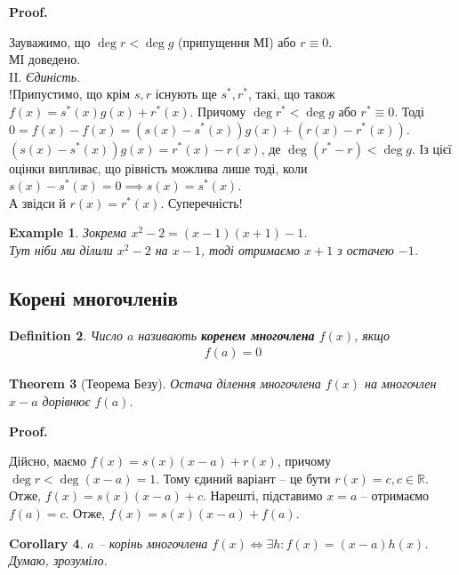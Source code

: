 \documentclass[a4paper, 10pt]{extarticle}
\makeatletter
\def\qed{$\blacksquare$}
\def\qed{$\blacksquare$}
\theoremstyle{theoremdd}
\newtheorem{theorem}{Theorem}[subsection]
\theoremstyle{theoremdd}
\newtheorem{definition}[theorem]{Definition}
\theoremstyle{theoremdd}
\theoremstyle{theoremdd}
\newtheorem{example}[theorem]{Example}
\theoremstyle{theoremdd}
\theoremstyle{theoremdd}
\theoremstyle{theoremdd}
\theoremstyle{theoremdd}
\newtheorem{corollary}[theorem]{Corollary}
\renewenvironment{proof}[1][Proof.\\]{\par
\pushQED{\hfill \qed}%
\normalfont \topsep6\p@\@plus6\p@\relax
\trivlist
\item\relax
{\bfseries
#1\@addpunct{.}}\hspace\labelsep\ignorespaces
}{%
\popQED\endtrivlist\@endpefalse
}
\makeatother
\begin{document}
\begin{proof}
Зауважимо, що $\deg r < \deg g$ (припущення МІ) або $r \equiv 0$.\\
МІ доведено.
\bigskip \\
II. \textit{Єдиність.}\\
!Припустимо, що крім $s,r$ існують ще $s^*,r^*$, такі, що також $f(x) = s^*(x)g(x) + r^*(x)$. Причому $\deg r^* < \deg g$ або $r^* \equiv 0$. Тоді \\ $0 = f(x) - f(x) = (s(x)-s^*(x))g(x) + (r(x)-r^*(x))$.\\
$(s(x)-s^*(x))g(x) = r^*(x)-r(x)$, де $\deg(r^*-r) < \deg g$. Із цієї оцінки випливає, що рівність можлива лише тоді, коли $s(x)-s^*(x) =0 \implies s(x) = s^*(x)$.\\
А звідси й $r(x) = r^*(x)$. Суперечність!
\end{proof}

\begin{example}
Зокрема $x^2-2 = (x-1)(x+1) -1$.\\
Тут ніби ми ділили $x^2-2$ на $x-1$, тоді отримаємо $x+1$ з остачею $-1$.
\end{example}

\subsection{Корені многочленів}
\begin{definition}
Число $a$ називають \textbf{коренем многочлена} $f(x)$, якщо
\begin{align*}
f(a) = 0
\end{align*}
\end{definition}

\begin{theorem}[Теорема Безу]
Остача ділення многочлена $f(x)$ на многочлен $x-a$ дорівнює $f(a)$.
\end{theorem}

\begin{proof}
Дійсно, маємо $f(x) = s(x)(x-a) + r(x)$, причому $\deg r < \deg (x-a) = 1$. Тому єдиний варіант -- це бути $r(x) = c, c \in \mathbb{R}$. Отже, $f(x) = s(x)(x-a) + c$. Нарешті, підставимо $x = a$ -- отримаємо $f(a) = c$. Отже, $f(x) = s(x)(x-a) + f(a)$.
\end{proof}

\begin{corollary}
$a$ -- корінь многочлена $f(x) \iff \exists h: f(x) = (x-a)h(x)$.\\
\textit{Думаю, зрозуміло.}
\end{corollary}
\end{document}
